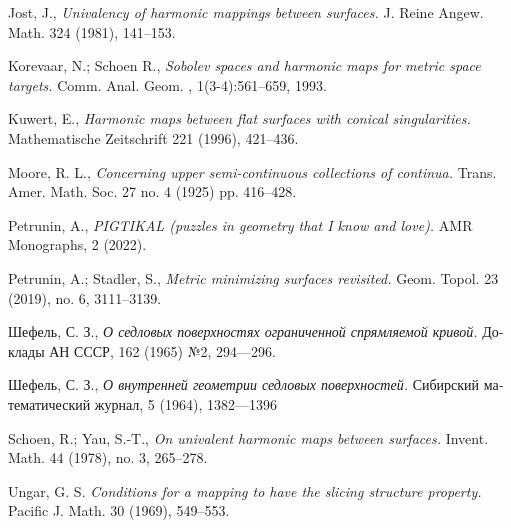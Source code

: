 \documentclass{article}
\begin{document}
\begin{thebibliography}{52}
 Jost, J.,
\textit{Univalency of harmonic mappings between surfaces.}
J. Reine Angew. Math. 324 (1981), 141--153.

 Korevaar, N.; Schoen R., 
\textit{Sobolev spaces and harmonic maps for metric space targets.}
Comm. Anal. Geom. , 1(3-4):561–659, 1993.

 Kuwert, E.,
\textit{Harmonic maps between flat surfaces with conical singularities.}
Mathematische Zeitschrift 221 (1996), 421--436.

Moore, R. L.,
\textit{Concerning upper semi-continuous collections of continua.}
Trans. Amer. Math. Soc. 27 no. 4 (1925) pp. 416--428.

 Petrunin, A., 
\textit{PIGTIKAL (puzzles in geometry that I know and love).}
AMR Monographs, 2 (2022).

 Petrunin, A.; Stadler, S., 
\textit{Metric minimizing surfaces revisited.} 
Geom. Topol. 23 (2019), no. 6, 3111--3139.

\begin{otherlanguage}{russian}
Шефель, С. З.,
\textit{О седловых поверхностях ограниченной спрямляемой кривой.}
Доклады АН СССР, 162 (1965) №2, 
294---296.
\end{otherlanguage}

\begin{otherlanguage}{russian}
Шефель, С. З., 
\textit{О внутренней геометрии седловых поверхностей.}
Сибирский математический журнал, 5 (1964), 1382---1396
\end{otherlanguage}

 Schoen, R.; Yau, S.-T.,
\textit{On univalent harmonic maps between surfaces.}
Invent. Math. 44 (1978), no. 3, 265--278.

 Ungar, G. S.
\textit{Conditions for a mapping to have the slicing structure property.}
Pacific J. Math. 30 (1969), 549--553.

\end{thebibliography}

\Addresses
\end{document}
